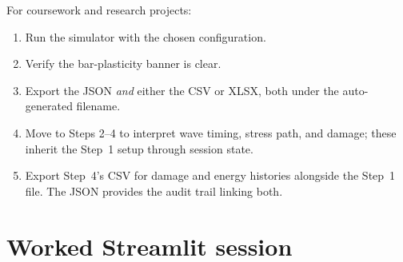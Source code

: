 \documentclass[11pt,a4paper,openany]{book}
\theoremstyle{handbook}
\begin{document}
\begin{conceptbox}
For coursework and research projects:
\begin{enumerate}[leftmargin=2em,itemsep=2pt]
  \item Run the simulator with the chosen configuration.
  \item Verify the bar-plasticity banner is clear.
  \item Export the JSON \emph{and} either the CSV or XLSX, both under the
        auto-generated filename.
  \item Move to Steps 2--4 to interpret wave timing, stress path, and
        damage; these inherit the Step~1 setup through session state.
  \item Export Step~4's CSV for damage and energy histories alongside the
        Step~1 file. The JSON provides the audit trail linking both.
\end{enumerate}
\end{conceptbox}

\section{Worked Streamlit session}
\end{document}
